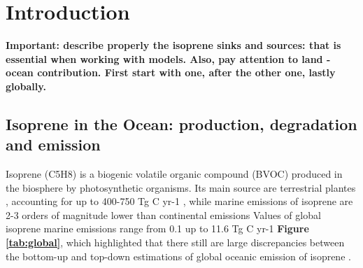 \documentclass[draft,linenumbers]{agujournal}
\begin{document}
%
% 
% 
% 

\section{Introduction}

\textbf{Important: describe properly the isoprene sinks and sources: that is essential when working with models. Also, pay attention to land - ocean contribution. First start with one, after the other one, lastly globally. }\\


\subsection{Isoprene in the Ocean: production, degradation and emission}

Isoprene (C5H8) is a biogenic volatile organic compound (BVOC) produced in the biosphere by photosynthetic organisms.
Its main source are terrestrial plantes \citep{zimmerman1988measurements,sharkey2001isoprene}, accounting for up to 400-750 Tg C yr-1 \citep{guenther2006estimates,muller2008global}, while marine emissions of isoprene are 2-3 orders of magnitude lower than continental emissions \citep{guenther1995global} 
Values of global isoprene marine emissions range from 0.1 \citep{palmer2005quantifying,gantt2009new} up to 11.6 Tg C yr-1 \citep{luo2010numerical,shaw2010production} \textbf{Figure \ref{tab:global}}, which highlighted that there still are large discrepancies between the bottom-up and top-down estimations of global oceanic emission of isoprene \citep{meskhidze2015quantifying,hackenberg2017potential}.\\
\end{document}
